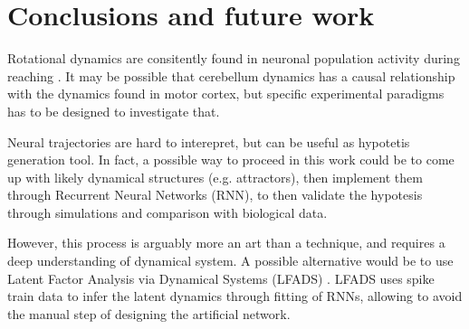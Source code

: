 \section{Conclusions and future work}

Rotational dynamics are consitently found in neuronal population activity during reaching \cite{churchland2012neural}. It may be possible that cerebellum dynamics has a causal relationship with the dynamics found in motor cortex, but specific experimental paradigms has to be designed to investigate that.

Neural trajectories are hard to interepret, but can be useful as hypotetis generation tool.
In fact, a possible way to proceed in this work could be to come up with likely dynamical structures (e.g. attractors), then implement them through Recurrent Neural Networks (RNN), to then validate the hypotesis through simulations and comparison with biological data.

However, this process is arguably more an art than a technique, and requires a deep understanding of dynamical system. A possible alternative would be to use Latent Factor Analysis via Dynamical Systems (LFADS) \cite{sussillo2016lfads}.
LFADS uses spike train data to infer the latent dynamics through fitting of RNNs, allowing to avoid the manual step of designing the artificial network.





